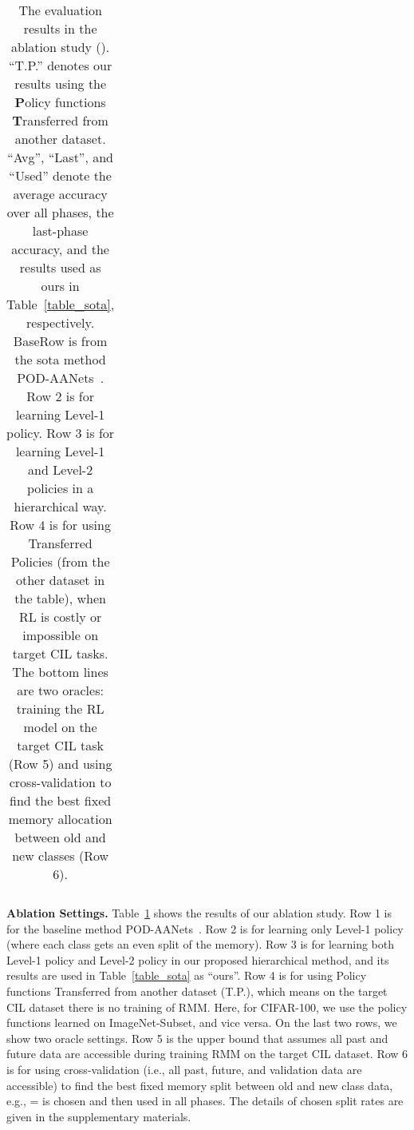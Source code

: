 \documentclass{article}
\newcommand{\myparagraph}[1]{\vspace{0.1em}\noindent\textbf{#1}}
\newcommand{\cotronlvsapcebottom}{\vspace{0.0cm}}
\begin{document}
{\begin{table}
\begin{tabular}{llcccccccccccccccccccc}
  \bottomrule
\end{tabular}
\vspace{0.4cm}
  \caption{The evaluation results in the ablation study (). ``T.P.'' denotes our results using the \textbf{P}olicy functions \textbf{T}ransferred from another dataset. 
``Avg'', ``Last'', and ``Used''
 denote the average accuracy over all phases, the last-phase accuracy, and the results used as ours in Table~\ref{table_sota},  respectively.
  BaseRow is from the sota method POD-AANets~\cite{Liu2020AANets}.
  Row 2 is for learning Level-1 policy.
  Row 3 is for learning Level-1 and Level-2 policies in a hierarchical way. 
  Row 4 is for using Transferred Policies (from the other dataset in the table), when RL is costly or impossible on target CIL tasks. 
The bottom lines are two oracles: training the RL model on the target CIL task (Row 5) and using cross-validation to find the best fixed memory allocation between old and new classes (Row 6).
  }
  
  \label{table_ablation}
\cotronlvsapcebottom
  \vspace{-0.2cm}
\end{table}
} 
\myparagraph{Ablation Settings.} Table~\ref{table_ablation} shows the results of our ablation study. 
Row 1 is for the baseline method POD-AANets~\cite{Liu2020AANets}. 
Row 2 is for learning only Level-1 policy  (where each class gets an even split of the memory). 
Row 3 is for learning both Level-1 policy  and Level-2 policy  in our proposed hierarchical method, and its results are used in Table~\ref{table_sota} as ``ours''. 
Row 4 is for using Policy functions Transferred from another dataset (T.P.), which means on the target CIL dataset there is no training of RMM.
Here, for CIFAR-100, we use the policy functions learned on ImageNet-Subset, and vice versa.
On the last two rows, we show two oracle settings. 
Row 5 is the upper bound that assumes all past and future data are accessible during training RMM on the target CIL dataset. 
Row 6 is for using cross-validation (i.e., all past, future, and validation data are accessible) to find the best fixed memory split between old and new class data, e.g.,  =  is chosen and then used in all phases. The details of chosen split rates are given in the supplementary materials. 
\end{document}
